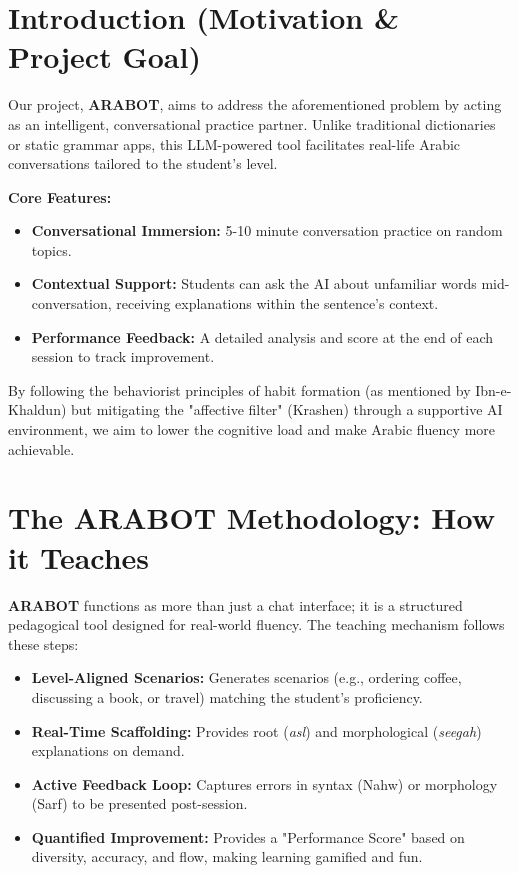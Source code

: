 \documentclass{article}
\begin{document}
\section{Introduction (Motivation \& Project Goal)}
Our project, \textbf{ARABOT}, aims to address the aforementioned problem by acting as an intelligent, conversational practice partner. Unlike traditional dictionaries or static grammar apps, this LLM-powered tool facilitates real-life Arabic conversations tailored to the student’s level.

\textbf{Core Features:}
\begin{itemize}
    \item \textbf{Conversational Immersion:} 5-10 minute conversation practice on random topics.
    \item \textbf{Contextual Support:} Students can ask the AI about unfamiliar words mid-conversation, receiving explanations within the sentence’s context.
    \item \textbf{Performance Feedback:} A detailed analysis and score at the end of each session to track improvement.
\end{itemize}

By following the behaviorist principles of habit formation (as mentioned by Ibn-e-Khaldun) but mitigating the "affective filter" (Krashen) through a supportive AI environment, we aim to lower the cognitive load and make Arabic fluency more achievable.

\section{The ARABOT Methodology: How it Teaches}
\textbf{ARABOT} functions as more than just a chat interface; it is a structured pedagogical tool designed for real-world fluency. The teaching mechanism follows these steps:

\begin{itemize}
    \item \textbf{Level-Aligned Scenarios:} Generates scenarios (e.g., ordering coffee, discussing a book, or travel) matching the student's proficiency.
    \item \textbf{Real-Time Scaffolding:} Provides root (\textit{asl}) and morphological (\textit{seegah}) explanations on demand.
    \item \textbf{Active Feedback Loop:} Captures errors in syntax (Nahw) or morphology (Sarf) to be presented post-session.
    \item \textbf{Quantified Improvement:} Provides a "Performance Score" based on diversity, accuracy, and flow, making learning gamified and fun.
\end{itemize}
\end{document}
